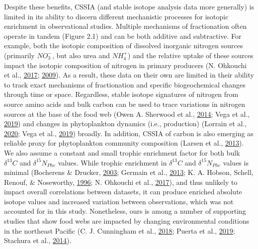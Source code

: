 \documentclass [11pt, proquest] {uwthesis}[2015/03/03]
\begin{document}
Despite these benefits, CSSIA (and stable isotope analysis data more
generally) is limited in its ability to discern different mechanistic
processes for isotopic enrichment in observational studies. Multiple
mechanisms of fractionation often operate in tandem (Figure 2.1) and can
be both additive and subtractive. For example, both the isotopic
composition of dissolved inorganic nitrogen sources (primarily
\(NO_3^-\), but also urea and \(NH_4^+\)) and the relative uptake of
these sources impact the isotopic composition of nitrogen in primary
producers (N. Ohkouchi et al.,
\protect\hyperlink{ref-Ohkouchi2017}{2017};
\protect\hyperlink{ref-Graham2010}{2009}). As a result, these data on
their own are limited in their ability to track exact mechanisms of
fractionation and specific biogeochemical changes through time or space.
Regardless, stable isotope signatures of nitrogen from source amino
acids and bulk carbon can be used to trace variations in nitrogen
sources at the base of the food web (Owen A. Sherwood et al.,
\protect\hyperlink{ref-Sherwood2014}{2014}; Vega et al.,
\protect\hyperlink{ref-delaVega2019}{2019}) and changes in phytoplankton
dynamics (i.e., production) (Lorrain et al.,
\protect\hyperlink{ref-Lorrain2020}{2020}; Vega et al.,
\protect\hyperlink{ref-delaVega2019}{2019}) broadly. In addition, CSSIA
of carbon is also emerging as reliable proxy for phytoplankton community
composition (Larsen et al., \protect\hyperlink{ref-Larsen2013}{2013}).
We also assume a constant and small trophic enrichment factor for both
bulk \(\delta^{13}C\) and \(\delta^{15}N_{Phe}\) values. While trophic
enrichment in \(\delta^{13}C\) and \(\delta^{15}N_{Phe}\) values is
minimal (Bocherens \& Drucker,
\protect\hyperlink{ref-Bocherens2003}{2003}; Germain et al.,
\protect\hyperlink{ref-Germain2013}{2013}; K. A. Hobson, Schell, Renouf,
\& Noseworthy, \protect\hyperlink{ref-Hobson1996}{1996}; N. Ohkouchi et
al., \protect\hyperlink{ref-Ohkouchi2017}{2017}), and thus unlikely to
impact overall correlations between datasets, it can produce enriched
absolute isotope values and increased variation between observations,
which was not accounted for in this study. Nonetheless, ours is among a
number of supporting studies that show food webs are impacted by
changing environmental conditions in the northeast Pacific (C. J.
Cunningham et al., \protect\hyperlink{ref-Cunningham2018}{2018}; Puerta
et al., \protect\hyperlink{ref-Puerta2019}{2019}; Stachura et al.,
\protect\hyperlink{ref-Stachura2014}{2014}).
\end{document}
